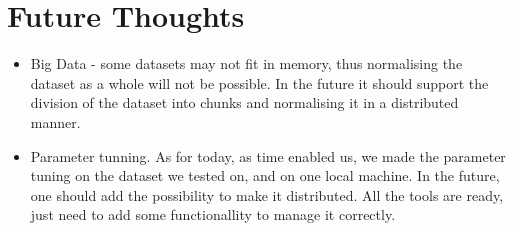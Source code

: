 \documentclass[12pt,a4paper]{article}
\begin{document}
\section{Future Thoughts}
\begin{itemize}
\item Big Data - some datasets may not fit in memory, thus normalising the dataset as a whole will not be possible. In the future it should support the division of the dataset into chunks and normalising it in a distributed manner.
\item Parameter tunning. As for today, as time enabled us, we made the parameter tuning on the dataset we tested on, and on one local machine. In the future, one should add the possibility to make it distributed. All the tools are ready, just need to add some functionallity to manage it correctly.
\end{itemize}



\end{document}
